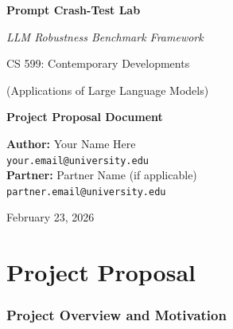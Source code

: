 \documentclass[11pt,a4paper]{article}
\begin{document}
\begin{titlepage}
    \centering
    \vspace*{2cm}
    
    {\Huge\bfseries Prompt Crash-Test Lab\par}
    \vspace{0.5cm}
    {\Large\itshape LLM Robustness Benchmark Framework\par}
    \vspace{2cm}
    
    {\Large CS 599: Contemporary Developments\par}
    {\Large (Applications of Large Language Models)\par}
    \vspace{1cm}
    
    {\large\bfseries Project Proposal Document\par}
    \vspace{2cm}
    
    {\Large
    \textbf{Author:} Your Name Here \\
    \texttt{your.email@university.edu} \\
    \vspace{0.5cm}
    \textbf{Partner:} Partner Name (if applicable) \\
    \texttt{partner.email@university.edu}
    \par}
    
    \vfill
    
    {\large February 23, 2026\par}
\end{titlepage}

\tableofcontents
\newpage

\part{Project Proposal}

\section{Project Overview and Motivation}
\end{document}
